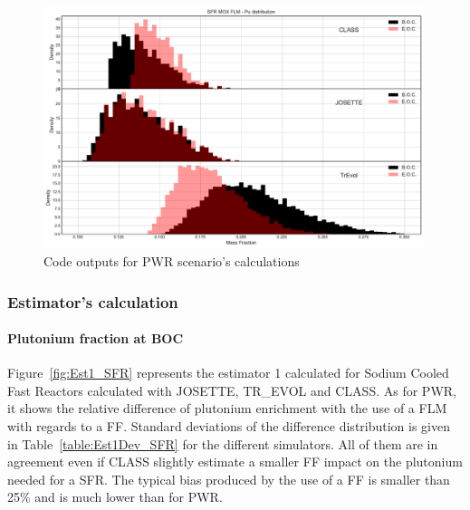 \begin{figure}[h]
	\begin{center}
		\includegraphics[width = 0.99\textwidth]{../../Feature_1/RAW_DATA/FIG/SFR_MOX_FLM_Pu.pdf}
		\caption{Code outputs for \gls{PWR} scenario's calculations}
		\label{fig:SFR_MOX_FLM_Pu}
	\end{center}
\end{figure}

\subsubsection{Estimator's calculation}
\paragraph{Plutonium fraction at \gls{BOC}}

Figure~\ref{fig:Est1_SFR} represents the estimator 1 calculated for Sodium
Cooled Fast Reactors calculated with JOSETTE, TR\_EVOL and CLASS. As for
\gls{PWR}, it shows the relative difference of plutonium enrichment with the use
of a \gls{FLM} with regards to a \gls{FF}. Standard deviations of the difference
distribution is given in Table~\ref{table:Est1Dev_SFR} for the different
simulators. All of them are in agreement even if CLASS slightly estimate a
smaller \gls{FF} impact on the plutonium needed for a \gls{SFR}. The typical bias
produced by the use of a \gls{FF} is smaller than 25\% and is much lower than
for \gls{PWR}.   

